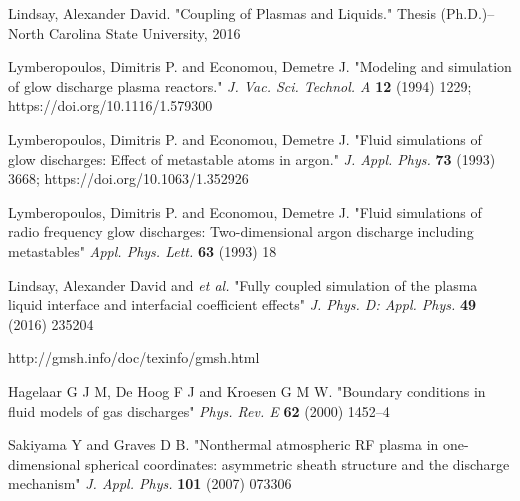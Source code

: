 \documentclass[final]{report}
\begin{document}
\begin{thebibliography}{9}
 Lindsay, Alexander David. "Coupling of Plasmas and Liquids." Thesis (Ph.D.)--North Carolina State University, 2016

 Lymberopoulos, Dimitris P. and Economou, Demetre J. "Modeling and simulation of glow discharge plasma reactors." \textit{J. Vac. Sci. Technol. A} \textbf{12} (1994) 1229; https://doi.org/10.1116/1.579300

Lymberopoulos, Dimitris P. and Economou, Demetre J. "Fluid simulations of glow discharges: Effect of metastable atoms in argon." \textit{J. Appl. Phys.} \textbf{73} (1993) 3668; https://doi.org/10.1063/1.352926

 Lymberopoulos, Dimitris P. and Economou, Demetre J. "Fluid simulations of radio frequency glow discharges: Two-dimensional argon discharge including metastables" \textit{Appl. Phys. Lett.} \textbf{63} (1993) 18

 Lindsay, Alexander David and \textit{et al.} "Fully coupled simulation of the plasma liquid interface and interfacial coefficient effects" \textit{J. Phys. D: Appl. Phys.} \textbf{49} (2016) 235204

 http://gmsh.info/doc/texinfo/gmsh.html

 Hagelaar G J M, De Hoog F J and Kroesen G M W. "Boundary conditions in fluid models of gas discharges" \textit{Phys. Rev. E} \textbf{62} (2000) 1452–4

 Sakiyama Y and Graves D B. "Nonthermal atmospheric RF plasma in one-dimensional spherical coordinates: asymmetric sheath structure and the discharge mechanism" \textit{J. Appl. Phys.} \textbf{101} (2007) 073306
\end{thebibliography}
\end{document}
